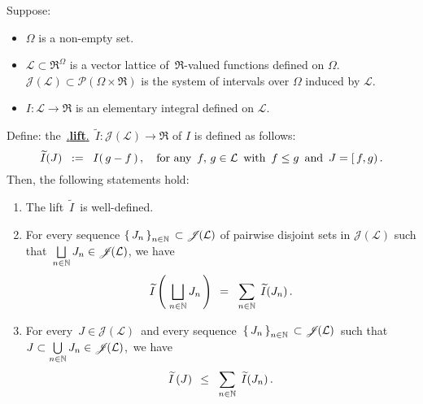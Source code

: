 \begin{lemma}
\mbox{}\vskip -0.3cm
\noindent
Suppose:
\begin{itemize}
\item
	$\Omega$ is a non-empty set.
\item
	$\mathcal{L} \subset \Re^{\Omega}$ is a vector lattice of \,$\Re$-valued functions defined on $\Omega$.
	\vskip 0.05cm
	$\mathscr{J}\!(\mathcal{L}) \subset \mathcal{P}\!\left(\Omega\times\Re\right)$ is the system of intervals
	over $\Omega$ induced by $\mathcal{L}$.
\item
	$I : \mathcal{L} \longrightarrow \Re$ is an elementary integral defined on $\mathcal{L}$.
\end{itemize}
Define:\; the \,\underline{{\color{white}.}\textbf{lift}{\color{white}.}}\,
$\widetilde{I} : \mathscr{J}\!(\mathcal{L}) \longrightarrow \Re$ of $I$ is defined as follows:
\begin{equation*}
\widetilde{I}(J)
\;\; := \;\;
	I(\,g - f\,)\,,
\quad\textnormal{for any \,$f,\,g\in\mathcal{L}$\, with \,$f \leq g$\, and \,$J = [\,f,g)$}\,.
\end{equation*}
Then, the following statements hold:
\begin{enumerate}
\item
	The lift \,$\widetilde{I}$\, is well-defined.
\item
	For every sequence $\left\{\,J_{n}\,\right\}_{n\in\mathbb{N}} \,\subset \mathscr{J}\!(\mathcal{L})$
	of pairwise disjoint sets in $\mathscr{J}\!(\mathcal{L})$ such that
	\,$\underset{n\in\mathbb{N}}{\bigsqcup}\,J_{n} \in \mathscr{J}\!(\mathcal{L})$, we have
	\begin{equation*}
	\widetilde{I}\left(\;\underset{n\in\mathbb{N}}{\bigsqcup}\,J_{n}\,\right)
	\;\, = \;\;
		\underset{n\in\mathbb{N}}{\sum}\;\,\widetilde{I}(J_{n})\,.
	\end{equation*}
\item
	For every \,$J \in \mathscr{J}\!(\mathcal{L})$\,
	and every sequence
	\,$\left\{\,J_{n}\,\right\}_{n\in\mathbb{N}} \,\subset \mathscr{J}\!(\mathcal{L})$\,
	such that
	\,$J \subset \underset{n\in\mathbb{N}}{\bigcup}\,J_{n} \in \mathscr{J}\!(\mathcal{L})$,\,
	we have
	\begin{equation*}
	\widetilde{I}\left(J\right)
	\;\, \leq \;\;
		\underset{n\in\mathbb{N}}{\sum}\;\,\widetilde{I}(J_{n})\,.
	\end{equation*}
\end{enumerate}
\end{lemma}

